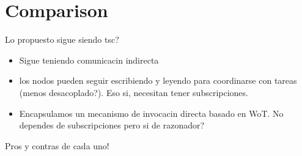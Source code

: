 
\section{Comparison}

Lo propuesto sigue siendo \ac{tsc}?

\begin{itemize}
  \item Sigue teniendo comunicacin indirecta
  \item los nodos pueden seguir escribiendo y leyendo para coordinarse con tareas (menos desacoplado?). Eso si, necesitan tener subscripciones.
  \item Encapsulamos un mecanismo de invocacin directa basado en WoT. No dependes de subscripciones pero si de razonador?
\end{itemize}


Pros y contras de cada uno!